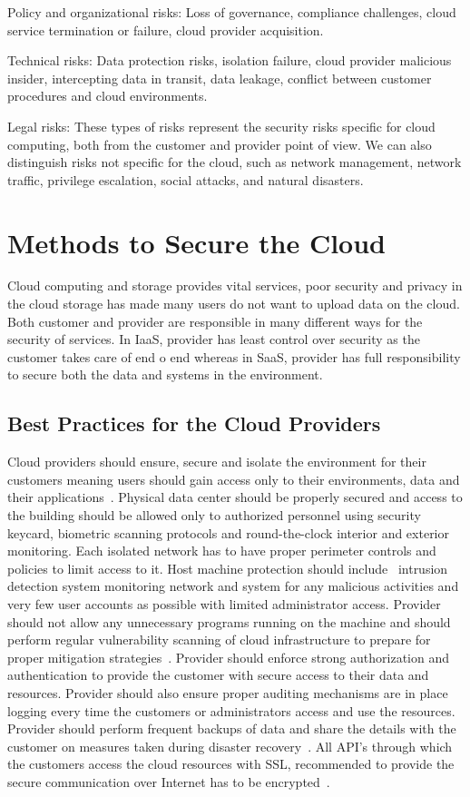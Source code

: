     Policy and organizational risks: Loss of governance, compliance 
challenges, cloud service termination or failure, cloud provider acquisition.

    Technical risks: Data protection risks, isolation failure, cloud provider 
malicious insider, intercepting data in transit, data leakage, conflict 
between customer procedures and cloud environments.

    Legal risks: These types of risks represent the security risks specific 
for cloud computing, both from the customer and provider point of view. 
We can also distinguish risks not specific for the cloud, such as network 
management, network traffic, privilege escalation, social attacks, and 
natural disasters.

\section{Methods to Secure the Cloud}
Cloud computing and storage provides vital services, poor security and 
privacy in the cloud storage has made many users do not want to 
upload data on the cloud. Both customer and provider are responsible in 
many different ways for the security of services. In IaaS, provider has
least control over security as the customer takes care of end o end 
whereas in SaaS, provider has full responsibility to secure both the 
data and systems in the environment.

\subsection{Best Practices for the Cloud Providers}
Cloud providers should ensure, secure and isolate the environment for their 
customers meaning users should gain access only to their environments, data
and their applications~\cite{hid-sp18-513-vmware}. Physical data center 
should be properly secured and access to the building should be allowed 
only to authorized personnel using security keycard, biometric scanning
protocols and round-the-clock interior and exterior monitoring. Each
isolated network has to have proper perimeter controls and policies to
limit access to it. Host machine protection should 
include~\cite{hid-sp18-513-diversity} intrusion detection system 
monitoring network and system for any malicious activities and very 
few user accounts as possible with limited administrator access. 
Provider should not allow any unnecessary programs running on the machine
and should perform regular vulnerability scanning of cloud infrastructure
to prepare for proper mitigation strategies~\cite{hid-sp18-513-winkler}. 
Provider should enforce strong authorization and authentication to 
provide the customer with secure access to their data and resources.
Provider should also ensure proper auditing mechanisms are in place
logging every time the customers or administrators access and use the
resources. Provider should perform frequent backups of data and share
the details with the customer on measures taken during 
disaster recovery~\cite{hid-sp18-513-vmware}. All API's through which
the customers access the cloud resources with SSL, recommended to
provide the secure communication over Internet has to be
encrypted~\cite{hid-sp18-513-diversity}.

